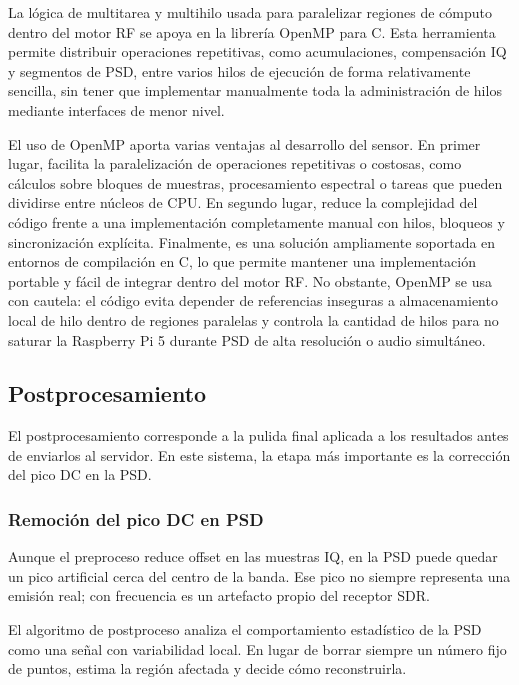 La lógica de multitarea y multihilo usada para paralelizar regiones de cómputo
dentro del motor RF se apoya en la librería OpenMP para C. Esta herramienta
permite distribuir operaciones repetitivas, como acumulaciones, compensación IQ y
segmentos de PSD, entre varios hilos de ejecución de forma relativamente sencilla,
sin tener que implementar manualmente toda la administración de hilos mediante
interfaces de menor nivel.

El uso de OpenMP aporta varias ventajas al desarrollo del sensor. En primer lugar,
facilita la paralelización de operaciones repetitivas o costosas, como cálculos
sobre bloques de muestras, procesamiento espectral o tareas que pueden dividirse
entre núcleos de CPU. En segundo lugar, reduce la complejidad del código frente a
una implementación completamente manual con hilos, bloqueos y sincronización
explícita. Finalmente, es una solución ampliamente soportada en entornos de
compilación en C, lo que permite mantener una implementación portable y fácil de
integrar dentro del motor RF. No obstante, OpenMP se usa con cautela: el código
evita depender de referencias inseguras a almacenamiento local de hilo dentro de
regiones paralelas y controla la cantidad de hilos para no saturar la Raspberry Pi
5 durante PSD de alta resolución o audio simultáneo.

\subsection{Postprocesamiento}

El postprocesamiento corresponde a la pulida final aplicada a los resultados antes
de enviarlos al servidor. En este sistema, la etapa más importante es la corrección
del pico DC en la PSD.

\subsubsection{Remoción del pico DC en PSD}

Aunque el preproceso reduce offset en las muestras IQ, en la PSD puede quedar un
pico artificial cerca del centro de la banda. Ese pico no siempre representa una
emisión real; con frecuencia es un artefacto propio del receptor SDR.

El algoritmo de postproceso analiza el comportamiento estadístico de la PSD como
una señal con variabilidad local. En lugar de borrar siempre un número fijo de
puntos, estima la región afectada y decide cómo reconstruirla.

